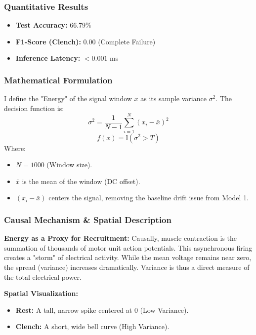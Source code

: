 \documentclass{article}
\begin{document}
\subsubsection{Quantitative Results}
\begin{itemize}
    \item \textbf{Test Accuracy:} 66.79\%
    \item \textbf{F1-Score (Clench):} 0.00 (Complete Failure)
    \item \textbf{Inference Latency:} $< 0.001$ ms
\end{itemize}

\subsubsection{Mathematical Formulation}
I define the "Energy" of the signal window $x$ as its sample variance $\sigma^2$. The decision function is:
\begin{equation}
    \sigma^2 = \frac{1}{N-1} \sum_{i=1}^{N} (x_i - \bar{x})^2
\end{equation}
\begin{equation}
    f(x) = \mathbb{I}(\sigma^2 > T)
\end{equation}
Where:
\begin{itemize}
    \item $N=1000$ (Window size).
    \item $\bar{x}$ is the mean of the window (DC offset).
    \item $(x_i - \bar{x})$ centers the signal, removing the baseline drift issue from Model 1.
\end{itemize}

\subsubsection{Causal Mechanism \& Spatial Description}
\textbf{Energy as a Proxy for Recruitment:} Causally, muscle contraction is the summation of thousands of motor unit action potentials. This asynchronous firing creates a "storm" of electrical activity. While the mean voltage remains near zero, the spread (variance) increases dramatically. Variance is thus a direct measure of the total electrical power.

\textbf{Spatial Visualization:}
\begin{itemize}
    \item \textbf{Rest:} A tall, narrow spike centered at 0 (Low Variance).
    \item \textbf{Clench:} A short, wide bell curve (High Variance).
\end{itemize}
\end{document}

